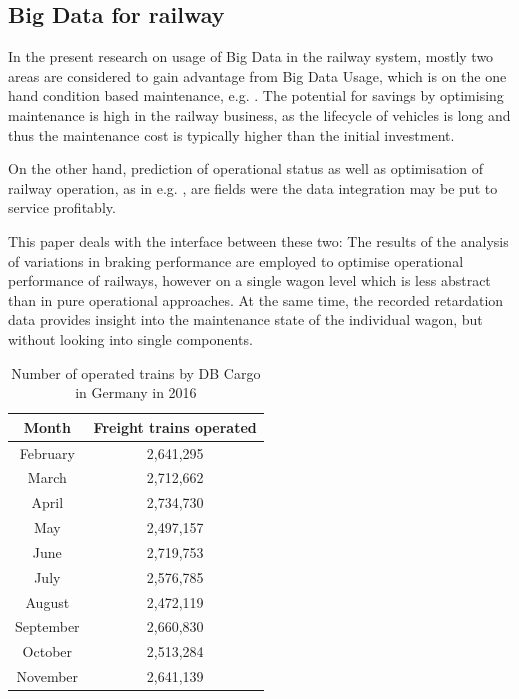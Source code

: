 \documentclass[a4paper, 12pt]{scrartcl}
\begin{document}
\subsection{Big Data for railway}
In the present research on usage of Big Data in the railway system, mostly two areas are considered to gain advantage from Big Data Usage, which is on the one hand condition based maintenance, e.g. \cite{fumeo2015condition, thaduri2015railway, elsen:Cray}. The potential for savings by optimising maintenance is high in the railway business, as the lifecycle of vehicles is long and thus the maintenance cost is typically higher than the initial investment.

On the other hand, prediction of operational status as well as optimisation of railway operation, as in e.g. \cite{papa2016delay, oneto2016delay, elsen:ISC17}, are fields were the data integration may be put to service profitably.

This paper deals with the interface between these two: The results of the analysis of variations in braking performance are employed to optimise operational performance of railways, however on a single wagon level which is less abstract than in pure operational approaches. At the same time, the recorded retardation data  provides insight into the maintenance state of the individual wagon, but without looking into single components.

\begin{table}  
	\begin{center}  
	\caption{Number of operated trains by DB Cargo in Germany in 2016}
	\label{Tab:Zugfahrten}
	\begin{tabular}{|c|c|}
		\hline
		\textbf{Month}	& \textbf{Freight trains operated} \\ \hline
		February & 2,641,295 \\ \hline
		March & 2,712,662 \\ \hline
		April & 2,734,730 \\ \hline
		May & 2,497,157 \\ \hline
		June & 2,719,753 \\ \hline
		July & 2,576,785 \\ \hline
		August & 2,472,119 \\ \hline
		September & 2,660,830 \\ \hline
		October & 2,513,284 \\ \hline
		November & 2,641,139 \\ \hline 
	\end{tabular}
	\end{center}
\end{table}
\end{document}
